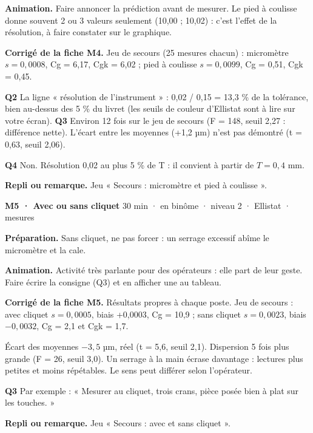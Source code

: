 \textbf{Animation.} Faire annoncer la prédiction avant de mesurer. Le pied à coulisse donne souvent 2 ou 3 valeurs seulement (10,00 ; 10,02) : c'est l'effet de la résolution, à faire constater sur le graphique.\par
\textbf{\color{ok}Corrigé de la fiche M4.} Jeu de secours (25 mesures chacun) : micromètre $s = 0{,}0008$, Cg = 6,17, Cgk = 6,02 ; pied à coulisse $s = 0{,}0099$, Cg = 0,51, Cgk = 0,45.\par \textbf{Q2} La ligne « résolution de l'instrument » : 0,02 / 0,15 = 13,3 \% de la tolérance, bien au-dessus des 5 \% du livret (les seuils de couleur d'Ellistat sont à lire sur votre écran). \textbf{Q3} Environ 12 fois sur le jeu de secours (F = 148, seuil 2,27 : différence nette). L'écart entre les moyennes (+1,2 µm) n'est pas démontré (t = 0,63, seuil 2,06).\par \textbf{Q4} Non. Résolution 0,02 au plus 5 \% de T : il convient à partir de $T = 0{,}4$ mm.\par
{\small\textbf{Repli ou remarque.} Jeu « Secours : micromètre et pied à coulisse ».}\par
\vspace{3pt}
\begin{tcolorbox}[act]\textbf{M5 · Avec ou sans cliquet} \hfill {\small 30 min · en binôme · niveau 2 · Ellistat · mesures}\end{tcolorbox}
\textbf{Préparation.} Sans cliquet, ne pas forcer : un serrage excessif abîme le micromètre et la cale.\par
\textbf{Animation.} Activité très parlante pour des opérateurs : elle part de leur geste. Faire écrire la consigne (Q3) et en afficher une au tableau.\par
\textbf{\color{ok}Corrigé de la fiche M5.} Résultats propres à chaque poste. Jeu de secours : avec cliquet $s = 0{,}0005$, biais +0,0003, Cg = 10,9 ; sans cliquet $s = 0{,}0023$, biais $-0{,}0032$, Cg = 2,1 et Cgk = 1,7.\par Écart des moyennes $-3{,}5$ µm, réel (t = 5,6, seuil 2,1). Dispersion 5 fois plus grande (F = 26, seuil 3,0). Un serrage à la main écrase davantage : lectures plus petites et moins répétables. Le sens peut différer selon l'opérateur.\par \textbf{Q3} Par exemple : « Mesurer au cliquet, trois crans, pièce posée bien à plat sur les touches. »\par
{\small\textbf{Repli ou remarque.} Jeu « Secours : avec et sans cliquet ».}\par
\vspace{3pt}
